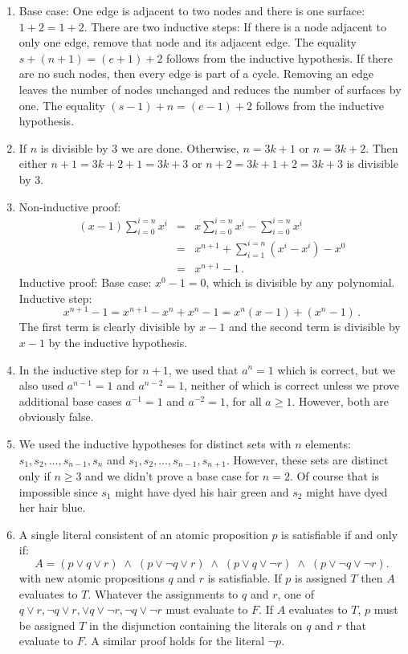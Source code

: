 \documentclass[11pt,a4paper]{report}
\begin{document}
\begin{enumerate}
\item Base case: One edge is adjacent to two nodes and there is one surface: $1+2=1+2$. There are two inductive steps: If there is a node adjacent to only one edge, remove that node and its adjacent edge. The equality $s+(n+1)=(e+1)+2$ follows from the inductive hypothesis. If there are no such nodes, then every edge is part of a cycle. Removing an edge leaves the number of nodes unchanged and reduces the number of surfaces by one. The equality $(s-1)+n=(e-1)+2$ follows from the inductive hypothesis.


\item If $n$ is divisible by $3$ we are done. Otherwise, $n=3k+1$ or $n=3k+2$. Then either $n+1=3k+2+1=3k+3$ or $n+2=3k+1+2=3k+3$ is divisible by $3$.

\item Non-inductive proof:
\begin{eqnarray*}
(x-1)\sum_{i=0}^{i=n}x^i &=& x\sum_{i=0}^{i=n}x^i - \sum_{i=0}^{i=n}x^i\\
&=&x^{n+1} + \sum_{i=1}^{i=n}(x^i-x^i) -x^0\\
&=&x^{n+1} - 1\,.
\end{eqnarray*}
Inductive proof: Base case: $x^0-1=0$, which is divisible by any polynomial. Inductive step:
\[
x^{n+1} - 1 = x^{n+1} -x^n + x^n - 1= x^n(x-1) + (x^n-1)\,.
\]
The first term is clearly divisible by $x-1$ and the second term is divisible by $x-1$ by the inductive hypothesis.

\item In the inductive step for $n+1$, we used that $a^{n}=1$ which is correct, but we also used $a^{n-1}=1$ and $a^{n-2}=1$, neither of which is correct unless we prove additional base cases $a^{-1}=1$ and $a^{-2}=1$, for all $a\geq 1$. However, both are obviously false.

\item We used the inductive hypotheses for distinct sets with $n$ elements: $s_1,s_2,\ldots,s_{n-1},s_n$ and $s_1,s_2,\ldots,s_{n-1},s_{n+1}$. However, these sets are distinct only if $n\geq 3$ and we didn't prove a base case for $n=2$. Of course that is impossible since $s_1$ might have dyed his hair green and $s_2$ might have dyed her hair blue.


\item A single literal consistent of an atomic proposition $p$ is satisfiable if and only if:
\[
A= (p \vee q \vee r) \;\wedge\; (p \vee \neg q \vee r) \;\wedge\; (p \vee q \vee \neg r) \;\wedge\; (p \vee \neg q \vee \neg r).
\]
with new atomic propositions $q$ and $r$ is satisfiable. If $p$ is assigned $T$ then $A$ evaluates to $T$. Whatever the assignments to $q$ and $r$, one of $q \vee r, \neg q \vee r,\vee q \vee \neg r, \neg q \vee \neg r$ must evaluate to $F$. If $A$ evaluates to $T$, $p$ must be assigned $T$ in the disjunction containing the literals on $q$ and $r$ that evaluate to $F$. A similar proof holds for the literal $\neg p$.


\end{enumerate}
\end{document}
